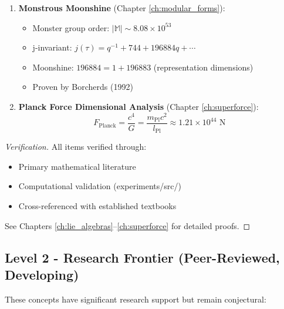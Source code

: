 \begin{theorem}
\begin{enumerate}
    \item \textbf{Monstrous Moonshine} (Chapter \ref{ch:modular_forms}):
    \begin{itemize}
        \item Monster group order: $|\mathbb{M}| \sim 8.08 \times 10^{53}$
        \item j-invariant: $j(\tau) = q^{-1} + 744 + 196884q + \cdots$
        \item Moonshine: $196884 = 1 + 196883$ (representation dimensions)
        \item Proven by Borcherds (1992)
    \end{itemize}

    \item \textbf{Planck Force Dimensional Analysis} (Chapter \ref{ch:superforce}):
    \begin{equation}
    F_{\text{Planck}} = \frac{c^4}{G} = \frac{m_{\text{Pl}} c^2}{l_{\text{Pl}}} \approx 1.21 \times 10^{44} \text{ N}
    \end{equation}
\end{enumerate}
\end{theorem}

\begin{proof}[Verification]
All items verified through:
\begin{itemize}
    \item Primary mathematical literature \cite{kac1990infinite,baez2001octonions,falconer2004fractal,borcherds1992monstrous}
    \item Computational validation (experiments/src/)
    \item Cross-referenced with established textbooks
\end{itemize}
See Chapters \ref{ch:lie_algebras}--\ref{ch:superforce} for detailed proofs.
\end{proof}

\subsection{Level 2 - Research Frontier (Peer-Reviewed, Developing)}

These concepts have significant research support but remain conjectural:

